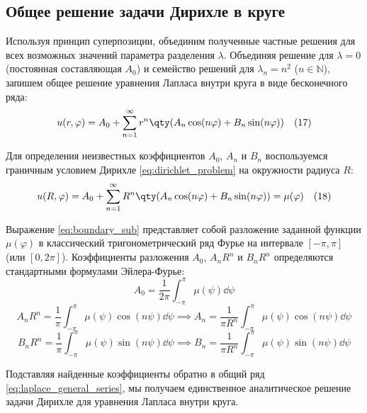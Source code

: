 	\subsection{Общее решение задачи Дирихле в круге}
	
	Используя принцип суперпозиции, объединим полученные частные решения для всех возможных значений параметра разделения $\lambda$. Объединяя решение для $\lambda = 0$ (постоянная составляющая $A_0$) и семейство решений для $\lambda_n = n^2$ ($n \in \mathbb{N}$), запишем общее решение уравнения Лапласа внутри круга в виде бесконечного ряда:
	\begin{equation} \label{eq:laplace_general_series}
		u(r,\varphi) = A_0 + \sum_{n=1}^{\infty} r^n \qty( A_n \cos(n\varphi) + B_n \sin(n\varphi) ) \quad (17)
	\end{equation}
	
	Для определения неизвестных коэффициентов $A_0$, $A_n$ и $B_n$ воспользуемся граничным условием Дирихле \eqref{eq:dirichlet_problem} на окружности радиуса $R$:
	\begin{equation} \label{eq:boundary_sub}
		u(R,\varphi) = A_0 + \sum_{n=1}^{\infty} R^n \qty( A_n \cos(n\varphi) + B_n \sin(n\varphi) ) = \mu(\varphi) \quad (18)
	\end{equation}
	
	Выражение \eqref{eq:boundary_sub} представляет собой разложение заданной функции $\mu(\varphi)$ в классический тригонометрический ряд Фурье на интервале $[-\pi, \pi]$ (или $[0, 2\pi]$). Коэффициенты разложения $A_0$, $A_n R^n$ и $B_n R^n$ определяются стандартными формулами Эйлера-Фурье:
	\begin{equation} \label{eq:coeff_a0}
		A_0 = \frac{1}{2\pi} \int_{-\pi}^{\pi} \mu(\psi) \dd{\psi}
	\end{equation}
	\begin{equation} \label{eq:coeff_an}
		A_n R^n = \frac{1}{\pi} \int_{-\pi}^{\pi} \mu(\psi) \cos(n\psi) \dd{\psi} \implies A_n = \frac{1}{\pi R^n} \int_{-\pi}^{\pi} \mu(\psi) \cos(n\psi) \dd{\psi}
	\end{equation}
	\begin{equation} \label{eq:coeff_bn}
		B_n R^n = \frac{1}{\pi} \int_{-\pi}^{\pi} \mu(\psi) \sin(n\psi) \dd{\psi} \implies B_n = \frac{1}{\pi R^n} \int_{-\pi}^{\pi} \mu(\psi) \sin(n\psi) \dd{\psi}
	\end{equation}
	
	Подставляя найденные коэффициенты обратно в общий ряд \eqref{eq:laplace_general_series}, мы получаем единственное аналитическое решение задачи Дирихле для уравнения Лапласа внутри круга.
	
